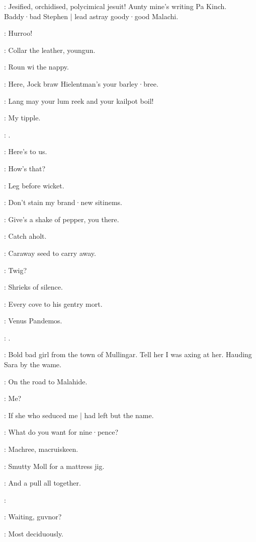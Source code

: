 \mulligan:
Jesified,
orchidised,
polycimical jesuit!
Aunty mine's writing Pa Kinch.
Baddy·bad Stephen |
lead astray goody·good Malachi.


\lenehan:
Hurroo!

\punch:
Collar the leather,
youngun.

\dixon:
Roun wi the nappy.

\lenehan:
Here,
Jock braw Hielentman's your barley·bree.

\crotthers:
Lang may your lum reek and your kailpot boil!

\stephen:
My tipple.

\mulligan:
.

\dixon:
Here's to us.

\madden:
How's that?

\lynch:
Leg before wicket.

\mulligan:
Don't stain my brand·new sitinems.

\crotthers:
Give's a shake of pepper,
you there.

\lenehan:
Catch aholt.

\Bloom:
Caraway seed to carry away.

\bannon:
Twig?

:
Shrieks of silence.

:
Every cove to his gentry mort.

\stephen:
Venus Pandemos.

\lynch:
.

\bannon:
Bold bad girl from the town of Mullingar.
Tell her I was axing at her.
Hauding Sara by the wame.

\lynch:
On the road to Malahide.

\crotthers:
Me?

\punch:
If she who seduced me |
had left but the name.

\lenehan:
What do you want for nine·pence?

\stephen:
Machree,
macruiskeen.

\lynch:
Smutty Moll for a mattress jig.

\punch:
And a pull all together.

\All:


\bystander:
Waiting,
guvnor?

\lenehan:
Most deciduously.

